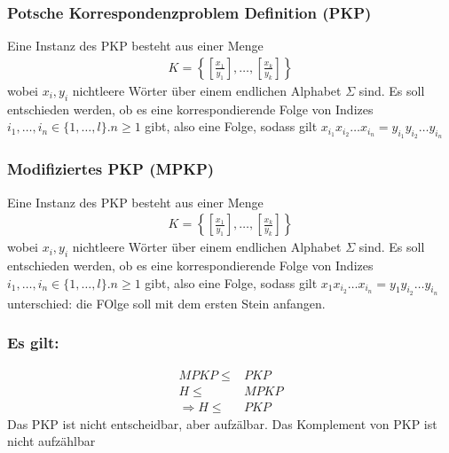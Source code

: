 \documentclass[a4paper, 10pt]{article}
\theoremstyle{definition}
\begin{document}
\subsubsection{Potsche Korrespondenzproblem Definition (PKP)}
Eine Instanz des PKP besteht aus einer Menge \begin{align*}
    K=\left\{\left[\frac{x_1}{y_1}\right],\dots,\left[\frac{x_k}{y_k}\right]\right\}
\end{align*}wobei $x_i,y_i$ nichtleere Wörter über einem endlichen Alphabet $\Sigma$ sind. Es soll entschieden werden, ob es eine korrespondierende Folge von Indizes $i_1,\dots,i_n\in\{1,\dots,l\}.n\geq 1$ gibt, also eine Folge, sodass gilt $x_{i_1}x_{i_2}\dots x_{i_n}=y_{i_1}y_{i_2}\dots y_{i_n}$\subsubsection{Modifiziertes PKP (MPKP)}
Eine Instanz des PKP besteht aus einer Menge \begin{align*}
    K=\left\{\left[\frac{x_1}{y_1}\right],\dots,\left[\frac{x_k}{y_k}\right]\right\}
\end{align*}wobei $x_i,y_i$ nichtleere Wörter über einem endlichen Alphabet $\Sigma$ sind. Es soll entschieden werden, ob es eine korrespondierende Folge von Indizes $i_1,\dots,i_n\in\{1,\dots,l\}.n\geq 1$ gibt, also eine Folge, sodass gilt $x_1x_{i_2}\dots x_{i_n}=y_1y_{i_2}\dots y_{i_n}$ unterschied: die FOlge soll mit dem ersten Stein anfangen.
\subsubsection{Es gilt:}
\begin{align*}
    MPKP\leq& PKP\\
    H\leq& MPKP\\
    \Longrightarrow H\leq & PKP
\end{align*}
Das PKP ist nicht entscheidbar, aber aufzälbar. Das Komplement von PKP ist nicht aufzählbar
\end{document}
